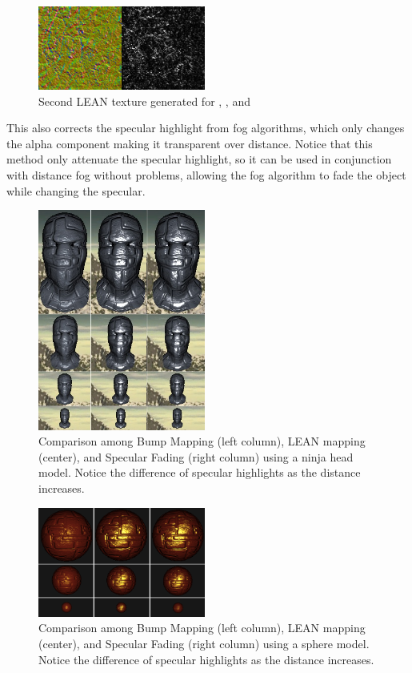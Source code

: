 \documentclass[10pt, conference]{IEEEtran}
\begin{document}
\begin{figure}[here]
\includegraphics[width=0.49\textwidth]{figs/Lean22.png}
\caption{Second LEAN texture generated for , ,  and }
\label{fig:Lean22}
\end{figure}
This also corrects the specular highlight from fog algorithms, which only changes the alpha component making it transparent over distance. Notice that this method only attenuate the specular highlight, so it can be used in conjunction with distance fog without problems, allowing the fog algorithm to fade the object while changing the specular.
\begin{figure}[here]
\includegraphics[width=0.49\textwidth]{figs/BLS1.png}
\caption{Comparison among Bump Mapping (left column), LEAN mapping (center), and Specular Fading (right column) using a ninja head model. Notice the difference of specular highlights as the distance increases.}
\label{fig:BLS1}
\end{figure}

\begin{figure}[here]
\includegraphics[width=0.49\textwidth]{figs/BLS2.png}
\caption{Comparison among Bump Mapping (left column), LEAN mapping (center), and Specular Fading (right column) using a sphere model. Notice the difference of specular highlights as the distance increases.}
\label{fig:BLS2}
\end{figure}
\end{document}
